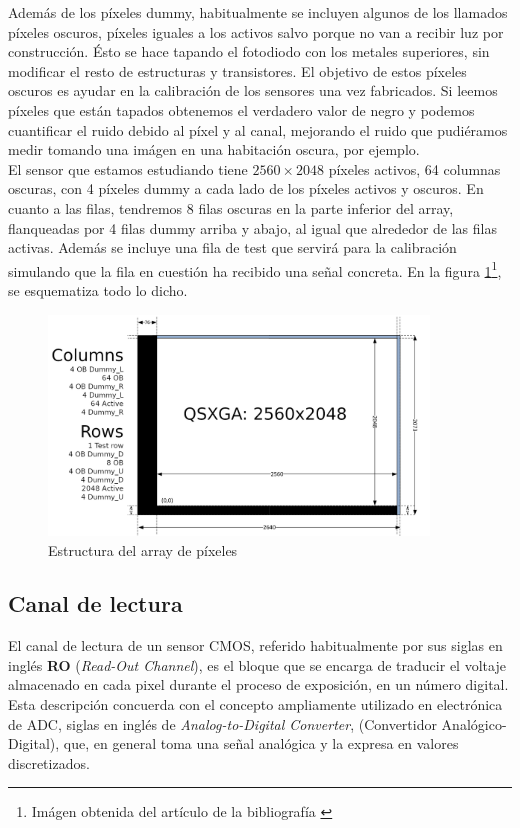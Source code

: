Además de los píxeles dummy, habitualmente se incluyen algunos de los llamados
píxeles oscuros, píxeles iguales a los activos salvo porque no van a recibir luz
por construcción. Ésto se hace tapando el fotodiodo con los metales superiores,
sin modificar el resto de estructuras y transistores. El objetivo de estos píxeles
oscuros es ayudar en la calibración de los sensores una vez fabricados. Si
leemos píxeles que están tapados obtenemos el verdadero valor de negro y podemos
cuantificar el ruido debido al píxel y al canal, mejorando el ruido
que pudiéramos medir tomando una imágen en una habitación oscura, por ejemplo.\\

El sensor que estamos estudiando tiene $2560\times2048$ píxeles activos, 64 columnas
oscuras, con 4 píxeles dummy a cada lado de los píxeles activos y oscuros.
En cuanto a las filas, tendremos 8 filas oscuras en la parte inferior del array,
flanqueadas por 4 filas dummy arriba y abajo, al igual que alrededor de las filas
activas. Además se incluye una fila de test que servirá para la calibración simulando
que la fila en cuestión ha recibido una señal concreta. En la figura
\ref{fig:pxa_array}\footnote{Imágen obtenida del artículo de la bibliografía \cite{Jimenez-Garrido2012}},
se esquematiza todo lo dicho.\\

\begin{figure}
	\centering
	\includegraphics[width=0.9\textwidth]{img/pixel_array.png}
	\caption{Estructura del array de píxeles}
	\label{fig:pxa_array}
\end{figure}

\subsection{Canal de lectura}

El canal de lectura de un sensor CMOS, referido habitualmente por sus
siglas en inglés \textbf{RO} (\textit{Read-Out Channel}), es el bloque que se
encarga de traducir el voltaje almacenado en cada pixel durante el proceso
de exposición, en un número digital. Esta descripción concuerda con el concepto
ampliamente utilizado en electrónica de ADC, siglas en inglés de \textit{Analog-to-Digital
Converter}, (Convertidor Analógico-Digital), que, en general toma una señal
analógica y la expresa en valores discretizados.\\

